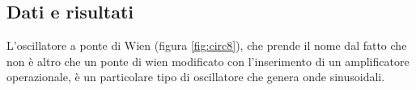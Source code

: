 \subsection{Dati e risultati}

L'oscillatore a ponte di Wien (figura \ref{fig:circ8}), che prende il nome dal fatto che non è altro
che un ponte di wien modificato con l'inserimento di un amplificatore operazionale, è un particolare
tipo di oscillatore che genera onde sinusoidali.

